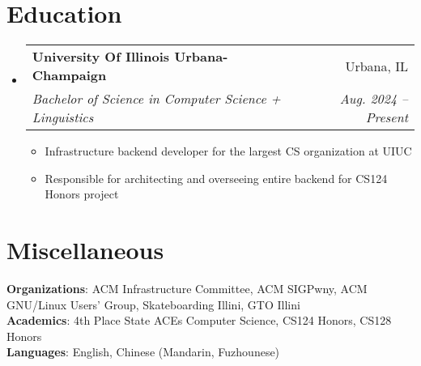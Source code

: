 \documentclass[letterpaper,11pt]{article}
\makeatletter
\newcommand{\resumeItem}[1]{
  \item\small{
    {#1 \vspace{-2pt}}
  }
}
\newcommand{\resumeSubheading}[4]{
  \vspace{-2pt}\item
    \begin{tabular*}{0.97\textwidth}[t]{l@{\extracolsep{\fill}}r}
      \textbf{#1} & #2 \\
      \textit{\small#3} & \textit{\small #4} \\
    \end{tabular*}\vspace{-7pt}
}
\newcommand{\resumeSubHeadingListStart}{\begin{itemize}[leftmargin=0.15in, label={}]}
\newcommand{\resumeSubHeadingListEnd}{\end{itemize}}
\newcommand{\resumeItemListStart}{\begin{itemize}}
\newcommand{\resumeItemListEnd}{\end{itemize}\vspace{-5pt}}
\makeatother
\begin{document}
\section{Education}
  \resumeSubHeadingListStart
    \resumeSubheading
      {University Of Illinois Urbana-Champaign}{Urbana, IL}
      {Bachelor of Science in Computer Science + Linguistics}{Aug. 2024 -- Present}
      \resumeItemListStart
        \resumeItem{Infrastructure backend developer for the largest CS organization at UIUC}
        \resumeItem{Responsible for architecting and overseeing entire backend for CS124 Honors project}
      \resumeItemListEnd

  \resumeSubHeadingListEnd

\section{Miscellaneous}
 \begin{itemize}[leftmargin=0.15in, label={}]
    \small{\item{
     \textbf{Organizations}{: ACM Infrastructure Committee, ACM SIGPwny, ACM GNU/Linux Users' Group, Skateboarding Illini, GTO Illini} \\
     \textbf{Academics}{: 4th Place State ACEs Computer Science, CS124 Honors, CS128 Honors} \\
     \textbf{Languages}{: English, Chinese (Mandarin, Fuzhounese)} \\
    }}
 \end{itemize}

\end{document}
